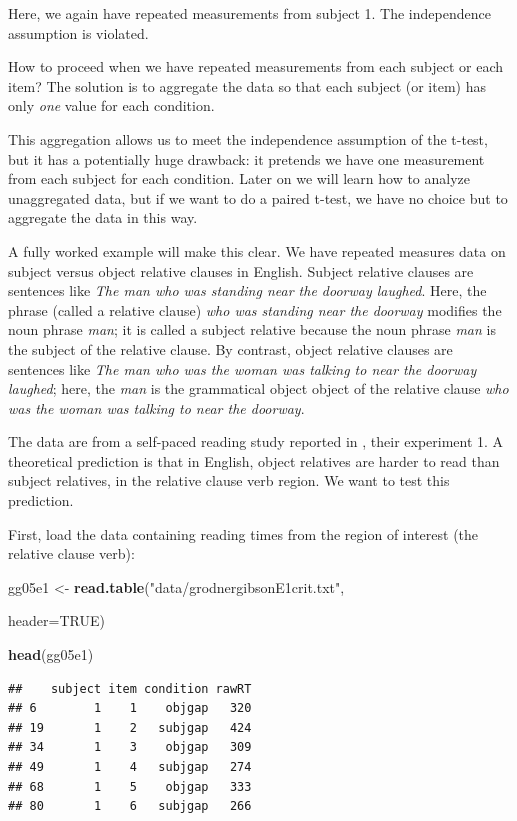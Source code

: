 \documentclass[12pt,]{krantz}
\newenvironment{Shaded}{\begin{snugshade}}{\end{snugshade}}
\newcommand{\DataTypeTok}[1]{\textcolor[rgb]{0.13,0.29,0.53}{#1}}
\newcommand{\KeywordTok}[1]{\textcolor[rgb]{0.13,0.29,0.53}{\textbf{#1}}}
\newcommand{\NormalTok}[1]{#1}
\newcommand{\OtherTok}[1]{\textcolor[rgb]{0.56,0.35,0.01}{#1}}
\newcommand{\StringTok}[1]{\textcolor[rgb]{0.31,0.60,0.02}{#1}}
\begin{document}
Here, we again have repeated measurements from subject 1. The independence assumption is violated.

How to proceed when we have repeated measurements from each subject or each item?
The solution is to aggregate the data so that each subject (or item) has only \emph{one} value for each condition.

This aggregation allows us to meet the independence assumption of the t-test, but it has a potentially huge drawback: it pretends we have one measurement from each subject for each condition.
Later on we will learn how to analyze unaggregated data, but if we want to do a paired t-test, we have no choice but to aggregate the data in this way.

A fully worked example will make this clear. We have repeated measures data on subject versus object relative clauses in English. Subject relative clauses are sentences like \emph{The man who was standing near the doorway laughed}. Here, the phrase (called a relative clause) \emph{who was standing near the doorway} modifies the noun phrase \emph{man}; it is called a subject relative because the noun phrase \emph{man} is the subject of the relative clause. By contrast, object relative clauses are sentences like \emph{The man who was the woman was talking to near the doorway laughed}; here, the \emph{man} is the grammatical object object of the relative clause \emph{who was the woman was talking to near the doorway}.

The data are from a self-paced reading study reported in \citet{grodner}, their experiment 1. A theoretical prediction is that in English, object relatives are harder to read than subject relatives, in the relative clause verb region. We want to test this prediction.

First, load the data containing reading times from the region of interest (the relative clause verb):

\begin{Shaded}
\begin{Highlighting}[]
\NormalTok{gg05e1 <-}\StringTok{ }\KeywordTok{read.table}\NormalTok{(}\StringTok{"data/grodnergibsonE1crit.txt"}\NormalTok{,}
                     
                     \DataTypeTok{header=}\OtherTok{TRUE}\NormalTok{)}

\KeywordTok{head}\NormalTok{(gg05e1)}
\end{Highlighting}
\end{Shaded}

\begin{verbatim}
##    subject item condition rawRT
## 6        1    1    objgap   320
## 19       1    2   subjgap   424
## 34       1    3    objgap   309
## 49       1    4   subjgap   274
## 68       1    5    objgap   333
## 80       1    6   subjgap   266
\end{verbatim}
\end{document}
